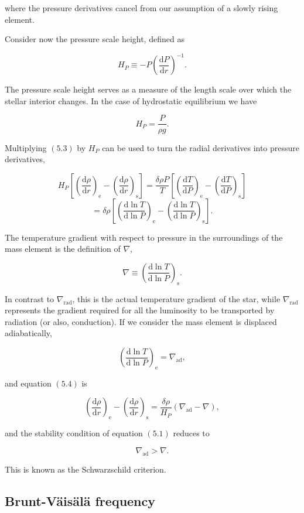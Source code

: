 \documentclass[twocolumn]{article}
\begin{document}
where the pressure derivatives cancel from our assumption of a slowly
rising element.

Consider now the pressure scale height, defined as

\[H_P\equiv -P\left(\frac{\mathrm{d}P}{\mathrm{d}r}\right)^{-1}.\]

The pressure scale height serves as a measure of the length scale over
which the stellar interior changes. In the case of hydrostatic
equilibrium we have

\[H_P = \frac{P}{\rho g}.\]

Multiplying \((5.3)\) by \(H_P\) can be used to turn the radial
derivatives into pressure derivatives,

\[H_P\left[\left(\frac{\mathrm{d}\rho}{\mathrm{d}r}\right)_\mathrm{e}-\left(\frac{\mathrm{d}\rho}{\mathrm{d}r}\right)_\mathrm{s}\right]=\frac{\delta \rho P}{T}\left[\left(\frac{\mathrm{d}T}{\mathrm{d}P}\right)_\mathrm{e}-\left(\frac{\mathrm{d}T}{\mathrm{d}P}\right)_\mathrm{s}\right]\]
\[=\delta\rho\left[\left(\frac{\mathrm{d}\ln T}{\mathrm{d}\ln P}\right)_\mathrm{e} - \left(\frac{\mathrm{d}\ln T}{\mathrm{d}\ln P}\right)_\mathrm{s}\right].\tag{5.4}\]

The temperature gradient with respect to pressure in the surroundings of
the mass element is the definition of \(\nabla\),

\[\nabla\equiv\left(\frac{\mathrm{d}\ln T}{\mathrm{d}\ln P}\right)_\mathrm{s}.\]

In contrast to \(\nabla_\mathrm{rad}\), this is the actual temperature
gradient of the star, while \(\nabla_\mathrm{rad}\) represents the
gradient required for all the luminosity to be transported by radiation
(or also, conduction). If we consider the mass element is displaced
adiabatically,

\[\left(\frac{\mathrm{d}\ln T}{\mathrm{d}\ln P}\right)_\mathrm{e}=\nabla_\mathrm{ad},\]

and equation \((5.4)\) is

\[\left(\frac{\mathrm{d}\rho}{\mathrm{d}r}\right)_\mathrm{e}-\left(\frac{\mathrm{d}\rho}{\mathrm{d}r}\right)_\mathrm{s} = \frac{\delta\rho}{H_P}(\nabla_\mathrm{ad}-\nabla),\tag{5.5}\]

and the stability condition of equation \((5.1)\) reduces to

\[\boxed{\nabla_\mathrm{ad}>\nabla.}\]

This is known as the Schwarzschild criterion.

\hypertarget{brunt-vuxe4isuxe4luxe4-frequency}{%
\subsection{Brunt-Väisälä
frequency}\label{brunt-vuxe4isuxe4luxe4-frequency}}
\end{document}
